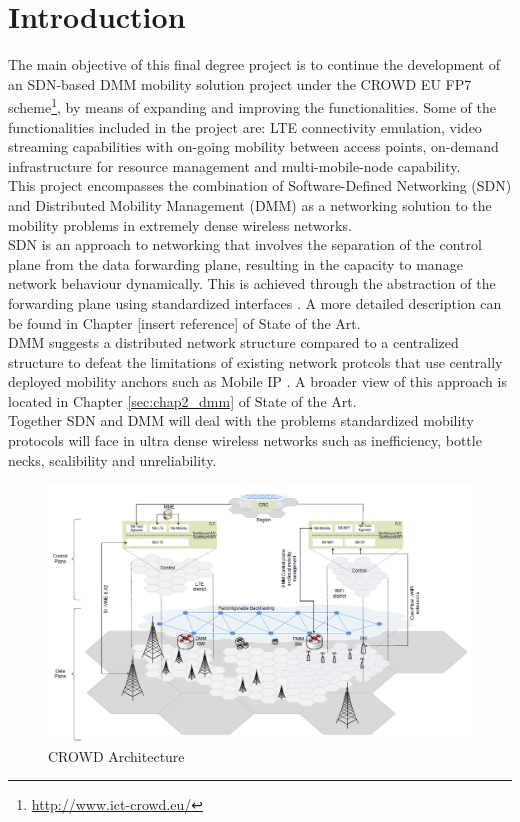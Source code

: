 \chapter{Introduction}\label{chap:1}

The main objective of this final degree project is to continue the development of an SDN-based DMM mobility solution project under the CROWD EU FP7 scheme\footnote{\url{http://www.ict-crowd.eu/}}, by means of expanding and improving the functionalities. Some of the functionalities included in the project are: LTE connectivity emulation, video streaming capabilities with on-going mobility between access points, on-demand infrastructure for resource management and multi-mobile-node capability.\\

This project encompasses the combination of Software-Defined Networking (SDN) and Distributed Mobility Management (DMM) as a networking solution to the mobility problems in extremely dense wireless networks.\\

SDN is an approach to networking that involves the separation of the control plane from the data forwarding plane, resulting in the capacity to manage network behaviour dynamically. This is achieved through the abstraction of the forwarding plane using standardized interfaces \cite{rfc_7426}. A more detailed description can be found in Chapter [insert reference] of State of the Art.\\

DMM suggests a distributed network structure compared to a centralized structure to defeat the limitations of existing network protcols that use centrally deployed mobility anchors such as Mobile IP \cite{rfc_6275}. A broader view of this approach is located in Chapter \ref{sec:chap2_dmm} of State of the Art.\\

Together SDN and DMM will deal with the problems standardized mobility protocols will face in ultra dense wireless networks such as inefficiency, bottle necks, scalibility and unreliability.

\begin{center}
\begin{figure}[h!]
  \centering
    \includegraphics[scale=0.5]{./images/crowd_arch}
	\caption{CROWD Architecture}
	\label{crowd_arch-fig}
\end{figure}
\end{center}

